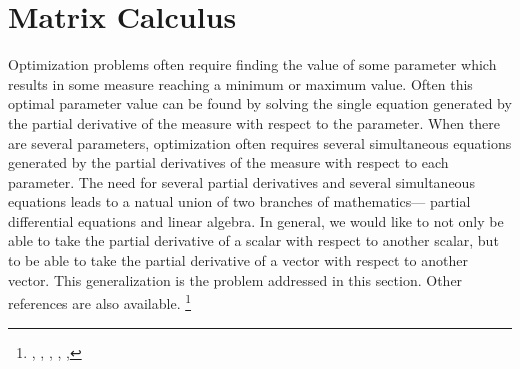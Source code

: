 
\chapter{Matrix Calculus}
\label{app:mc}

Optimization problems often require finding the value of some parameter
which results in some measure reaching a minimum or maximum value.
Often this optimal parameter value can be found by 
solving the single equation generated by the 
partial derivative of the measure with respect to the parameter.
When there are several parameters, 
optimization often requires several simultaneous equations
generated by the
partial derivatives of the measure with respect to each parameter.
The need for several partial derivatives and several simultaneous
equations leads to a natual union of two branches of mathematics---
partial differential equations and linear algebra.
In general, we would like to not only be able to take the partial 
derivative of a scalar with respect to another scalar,
but to be able to take the partial derivative of a vector 
with respect to another vector.
This generalization is the problem addressed in this section.
Other references are also available.%
\footnote{
  ,
  ,
  ,  
  ,        
  ,
  }

